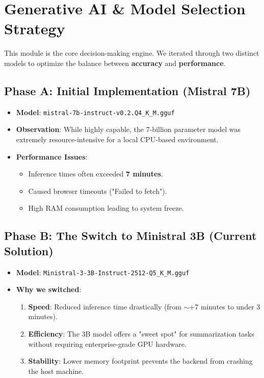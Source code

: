\documentclass{article}
\begin{document}
\section{Generative AI \& Model Selection Strategy}
This module is the core decision-making engine. We iterated through two distinct models to optimize the balance between \textbf{accuracy} and \textbf{performance}.

\subsection{Phase A: Initial Implementation (Mistral 7B)}
\begin{itemize}
    \item \textbf{Model}: \texttt{mistral-7b-instruct-v0.2.Q4\_K\_M.gguf}
    \item \textbf{Observation}: While highly capable, the 7-billion parameter model was extremely resource-intensive for a local CPU-based environment.
    \item \textbf{Performance Issues}:
    \begin{itemize}
        \item Inference times often exceeded \textbf{7 minutes}.
        \item Caused browser timeouts ("Failed to fetch").
        \item High RAM consumption leading to system freeze.
    \end{itemize}
\end{itemize}

\subsection{Phase B: The Switch to Ministral 3B (Current Solution)}
\begin{itemize}
    \item \textbf{Model}: \texttt{Ministral-3-3B-Instruct-2512-Q5\_K\_M.gguf}
    \item \textbf{Why we switched}:
    \begin{enumerate}
        \item \textbf{Speed}: Reduced inference time drastically (from $\sim$+7 minutes to under 3 minutes).
        \item \textbf{Efficiency}: The 3B model offers a "sweet spot" for summarization tasks without requiring enterprise-grade GPU hardware.
        \item \textbf{Stability}: Lower memory footprint prevents the backend from crashing the host machine.
    \end{enumerate}
\end{itemize}
\end{document}

